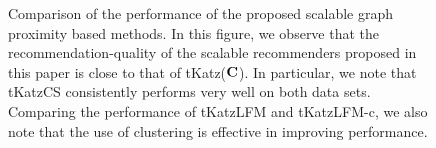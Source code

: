 \begin{figure}[ht]
  \begin{center}
  \end{center}
  \caption{Comparison of the performance of the proposed scalable graph proximity based methods. In this figure, we observe that the recommendation-quality of the scalable recommenders proposed in this paper is close to that of \textsf{tKatz}($\mathbf{C}$). In particular, we note that \textsf{tKatzCS} consistently performs very well on both data sets. Comparing the performance of \textsf{tKatzLFM} and \textsf{tKatzLFM-c}, we also note that the use of clustering is effective in improving performance.}
  \label{fig:summaryScalability}
\end{figure}


